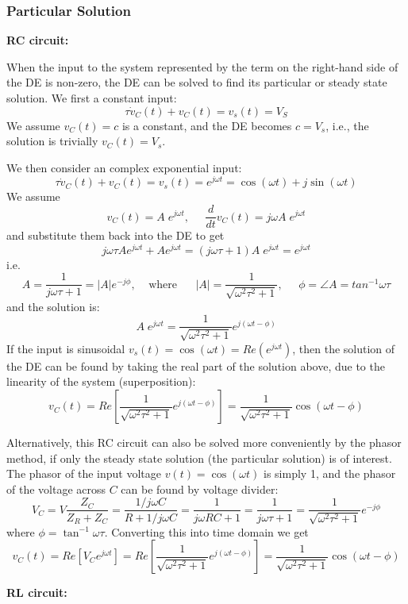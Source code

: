 

\subsubsection*{Particular Solution}

{\bf RC circuit:}

When the input to the system represented by the term on the right-hand 
side of the DE is non-zero, the DE can be solved to find its particular 
or steady state solution. We first a constant input:
\[	
\tau\dot{v}_C(t)+v_C(t)=v_s(t)=V_S
\]
We assume $v_C(t)=c$ is a constant, and the DE becomes $c=V_s$, i.e.,
the solution is trivially $v_C(t)=V_s$. 

We then consider an complex exponential input:
\[	
\tau\dot{v}_C(t)+v_C(t)=v_s(t)=e^{j\omega t}=\cos(\omega t)+j\sin(\omega t)
\]
We assume
\[ 
v_C(t)=A\;e^{j\omega t},\;\;\;\;\;\frac{d}{dt}v_C(t)=j\omega A\;e^{j\omega t} 
\]
and substitute them back into the DE to get
\[
j\omega \tau A e^{j\omega t}+A e^{j\omega t}
=(j\omega \tau+1)A\; e^{j\omega t}=e^{j\omega t} 
\]
i.e.
\[
A=\frac{1}{j\omega\tau+1}=|A|e^{-j\phi},\;\;\;\;\mbox{where}
\;\;\;\;\;\;|A|=\frac{1}{\sqrt{\omega^2 \tau^2+1}},\;\;\;\;\;
\phi=\angle A=tan^{-1}\omega\tau
\]
and the solution is:
\[
A\;e^{j\omega t}=\frac{1}{\sqrt{\omega^2 \tau^2+1}} e^{j(\omega t-\phi)} 
\]
If the input is sinusoidal $v_s(t)=\cos(\omega t)=Re(e^{j\omega t})$,
then the solution of the DE can be found by taking the real part 
of the solution above, due to the linearity of the system
(superposition):
\[
v_C(t)=Re\left[\frac{1}{\sqrt{\omega^2 \tau^2+1}} e^{j(\omega t-\phi)}\right]
=\frac{1}{\sqrt{\omega^2 \tau^2+1}} \cos(\omega t-\phi)
\]

Alternatively, this RC circuit can also be solved more conveniently by
the phasor method, if only the steady state solution (the particular
solution) is of interest. The phasor of the input voltage 
$v(t)=\cos(\omega t)$ is simply 1, and the phasor of the voltage across
$C$ can be found by voltage divider:
\[
V_C=V\frac{Z_C}{Z_R+Z_C}=\frac{1/j\omega C}{R+1/j\omega C}
=\frac{1}{j\omega RC+1}=\frac{1}{j\omega \tau+1}
=\frac{1}{\sqrt{\omega^2\tau^2+1}} e^{-j\phi}
\]
where $\phi=\tan^{-1}\omega\tau$. Converting this into time domain
we get
\[
v_C(t)=Re[V_Ce^{j\omega t}]
=Re\left[\frac{1}{\sqrt{\omega^2\tau^2+1}}e^{j(\omega t-\phi)}\right]
=\frac{1}{\sqrt{\omega^2\tau^2+1}}\cos(\omega t-\phi)
\]

{\bf RL circuit:}

